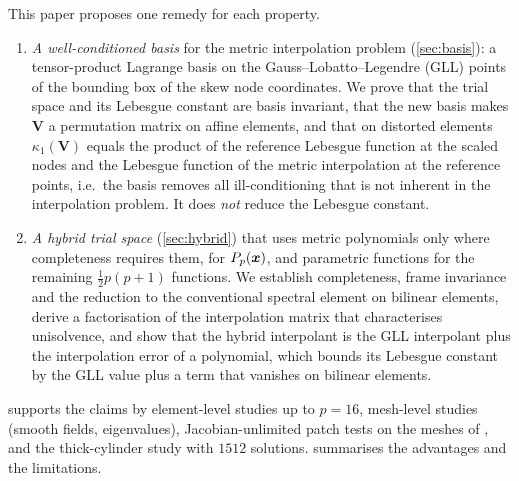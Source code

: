 This paper proposes one remedy for each property.
\begin{enumerate}
\item \emph{A well-conditioned basis} for the metric interpolation problem
  (\cref{sec:basis}): a tensor-product Lagrange basis on the Gauss--Lobatto--Legendre (GLL)
  points of the bounding box of the skew node coordinates. We prove that the trial space and its
  Lebesgue constant are basis invariant, that the new basis makes $\bm V$ a permutation matrix on
  affine elements, and that on distorted elements $\kappa_1(\bm V)$ equals the product of the
  reference Lebesgue function at the scaled nodes and the Lebesgue function of the metric
  interpolation at the reference points, i.e.\ the basis removes all ill-conditioning that is not
  inherent in the interpolation problem. It does \emph{not} reduce the Lebesgue constant.
\item \emph{A hybrid trial space} (\cref{sec:hybrid}) that uses metric polynomials only where
  completeness requires them, for $P_p(\bm{x})$, and parametric functions for the remaining
  $\tfrac12p(p+1)$ functions. We establish completeness, frame invariance and the reduction to
  the conventional spectral element on bilinear elements, derive a factorisation of the
  interpolation matrix that characterises unisolvence, and show that the hybrid interpolant is
  the GLL interpolant plus the interpolation error of a polynomial, which bounds its Lebesgue
  constant by the GLL value plus a term that vanishes on bilinear elements.
\end{enumerate}
 supports the claims by element-level studies up to $p=16$, mesh-level
studies (smooth fields, eigenvalues), Jacobian-unlimited patch tests on the meshes of
\citet{Rajendran2010technique}, and the thick-cylinder study with $1512$ solutions.
 summarises the advantages and the limitations.
